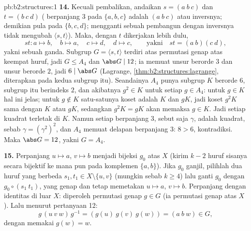 \begin{solution}{pb:b2:structures:1}
\textbf{14.} Kecuali pembalikan, andaikan $s = (a\ b\ c)$ dan $t =
(b\ c\ d)$ ( berpanjang $3$ pada $\{a,b,c\}$ adalah $(a\ b\ c)$
atau inversnya; demikian pula pada $\{b,c,d\}$; mengganti sebuah
pembangun dengan inversnya tidak mengubah $\langle s, t\rangle$). Maka,
dengan $t$ dikerjakan lebih dulu,
\[
st \colon a \mapsto b,\quad b \mapsto a,\quad c \mapsto d,\quad
d \mapsto c, \qquad\text{yakni}\quad st = (a\ b)(c\ d),
\]
yakni sebuah  ganda. Subgrup $G = \langle s, t\rangle$
terdiri atas permutasi genap atas keempat huruf, jadi $G \leq
A_4$ dan $\abs G \mid 12$; ia memuat unsur berorde $3$
dan unsur berorde $2$, jadi $6 \mid \abs G$ (Lagrange,
\cref{thm:b2:structures:lagrange}, diterapkan pada kedua subgrup
 itu). Seandainya $A_4$ punya subgrup $K$ berorde $6$, subgrup itu
berindeks $2$, dan akibatnya $g^2 \in K$ untuk setiap $g \in A_4$: untuk
$g \in K$ hal ini jelas; untuk $g \notin K$ satu-satunya koset adalah
$K$ dan $gK$, jadi koset $g^2K$ sama dengan $K$ atau $gK$, sedangkan
$g^2K = gK$ akan memaksa $g \in K$. Jadi setiap kuadrat terletak di $K$.
Namun setiap  berpanjang $3$, sebut saja $\gamma$, adalah kuadrat, sebab
$\gamma = (\gamma^2)^2$, dan $A_4$ memuat delapan  berpanjang $3$:
$8 > 6$, kontradiksi. Maka $\abs G = 12$, yakni $G = A_4$.

\textbf{15.} Perpanjang $u \mapsto a$, $v \mapsto b$ menjadi bijeksi
$g_0$ atas $X$ (kirim $k - 2$ huruf sisanya secara bijektif ke mana pun
pada komplemen $\{a, b\}$). Jika $g_0$ ganjil, pilihlah dua huruf yang
berbeda $s_1, t_1 \in X \setminus \{u, v\}$ (mungkin sebab $k \geq 4$)
lalu ganti $g_0$ dengan $g_0 \circ (s_1\ t_1)$, yang genap dan tetap
memetakan $u \mapsto a$, $v \mapsto b$. Perpanjang dengan identitas di
luar $X$: diperoleh permutasi genap $g \in G$ (ia permutasi genap atas
$X$). Lalu menurut pertanyaan 12:
\[
g\,(u\ v\ w)\,g^{-1} = (g(u)\ g(v)\ g(w)) = (a\ b\ w) \in G,
\]
dengan memakai $g(w) = w$.


\end{solution}
